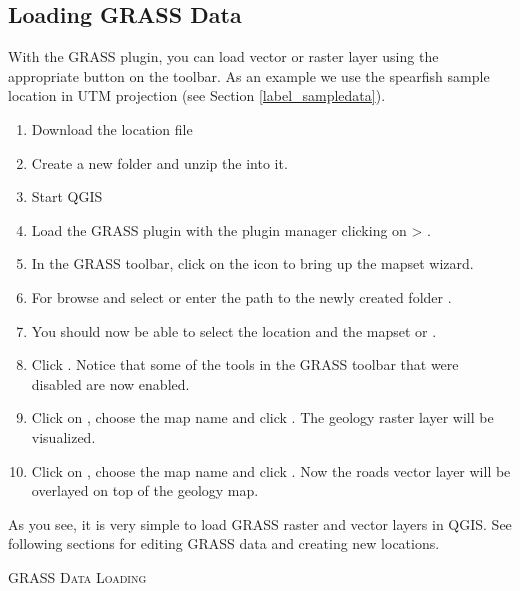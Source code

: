 \subsection{Loading GRASS Data}\label{sec:load_grassdata}

With the GRASS plugin, you can load vector or raster layer using the
appropriate button on the toolbar. As an example we use the spearfish
sample location in UTM projection (see Section \ref{label_sampledata}).

\begin{enumerate}
  \item Download the  location file
  \item Create a new folder  and unzip the
   into it. 
  \item Start QGIS
  \item Load the GRASS plugin with the plugin manager clicking on
   > .
  \item In the GRASS toolbar, click on the  icon to bring up the mapset wizard.
  \item For  browse and select or enter the path to the newly
  created folder .
  \item You should now be able to select the location 
  and the mapset  or . 
  \item Click . Notice that some of the tools in the GRASS toolbar
  that were disabled are now enabled.
  \item Click on ,
  choose the map name  and click . The geology
  raster layer will be visualized. 
  \item Click on ,
  choose the map name  and click . Now the roads
  vector layer will be overlayed on top of the geology map.  
\end{enumerate}

As you see, it is very simple to load GRASS raster and vector layers in QGIS.
See following sections for editing GRASS data and creating new locations.

\begin{Tip}\caption{\textsc{GRASS Data Loading}}
\end{Tip} 

